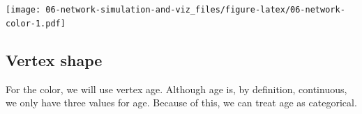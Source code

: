 \documentclass[]{book}
\newenvironment{Shaded}{\begin{snugshade}}{\end{snugshade}}
\newcommand{\DataTypeTok}[1]{\textcolor[rgb]{0.13,0.29,0.53}{#1}}
\newcommand{\KeywordTok}[1]{\textcolor[rgb]{0.13,0.29,0.53}{\textbf{#1}}}
\newcommand{\NormalTok}[1]{#1}
\newcommand{\OperatorTok}[1]{\textcolor[rgb]{0.81,0.36,0.00}{\textbf{#1}}}
\newcommand{\StringTok}[1]{\textcolor[rgb]{0.31,0.60,0.02}{#1}}
\begin{document}
\begin{Shaded}
\end{Shaded}

\texttt{[image: 06-network-simulation-and-viz\_files/figure-latex/06-network-color-1.pdf]}

\hypertarget{vertex-shape}{%
\subsection{Vertex shape}\label{vertex-shape}}

For the color, we will use vertex age. Although age is, by definition, continuous,
we only have three values for age. Because of this, we can treat age as categorical.
\end{document}
